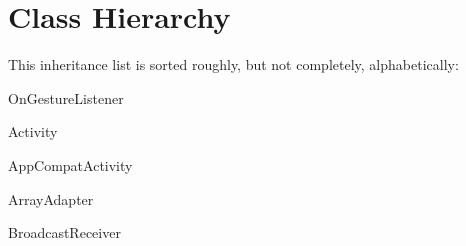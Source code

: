 \section{Class Hierarchy}
This inheritance list is sorted roughly, but not completely, alphabetically\+:\begin{DoxyCompactList}
\item {}
\item {}
\begin{DoxyCompactList}
\item {}
\end{DoxyCompactList}
\item {}
\item On\+Gesture\+Listener\begin{DoxyCompactList}
\item {}
\end{DoxyCompactList}
\item {}
\item {}
\item Activity\begin{DoxyCompactList}
\item {}
\end{DoxyCompactList}
\item App\+Compat\+Activity\begin{DoxyCompactList}
\item {}
\item {}
\end{DoxyCompactList}
\item Array\+Adapter\begin{DoxyCompactList}
\item {}
\item {}
\end{DoxyCompactList}
\item Broadcast\+Receiver\begin{DoxyCompactList}

\end{DoxyCompactList}
\end{DoxyCompactList}
